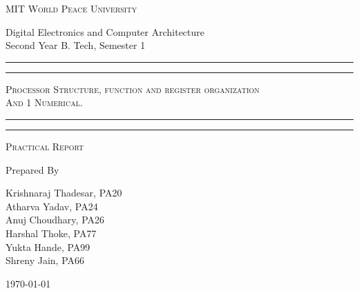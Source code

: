 \documentclass[11pt]{article}
\begin{document}
\begin{titlepage}
	\centering


	\huge\textsc{
		MIT World Peace University
	}\\

	\vspace{0.75\baselineskip} %

	\LARGE{
		Digital Electronics and Computer Architecture\\
		Second Year B. Tech, Semester 1
	}

	\vfill %


	\rule{\textwidth}{1.6pt}\vspace*{-\baselineskip}\vspace*{2pt}
	\rule{\textwidth}{0.6pt}
	\vspace{0.75\baselineskip} %



	\huge{\textsc{
			Processor Structure, function and register organization\\
			And 1 Numerical.
		}} \\



	\vspace{0.5\baselineskip} %
	\rule{\textwidth}{0.6pt}\vspace*{-\baselineskip}\vspace*{2.8pt}
	\rule{\textwidth}{1.6pt}

	\vspace{1\baselineskip} %


	\LARGE\textsc{
		Practical Report
	} %
	\vfill


	Prepared By
	\vspace{0.5\baselineskip} %

	\Large{
		Krishnaraj Thadesar, PA20 \\
		Atharva Yadav, PA24\\
		Anuj Choudhary, PA26\\
		Harshal Thoke, PA77\\
		Yukta Hande, PA99\\
		Shreny Jain, PA66\\
	}


	\vspace{0.5\baselineskip} %
	\today

\end{titlepage}
\end{document}

